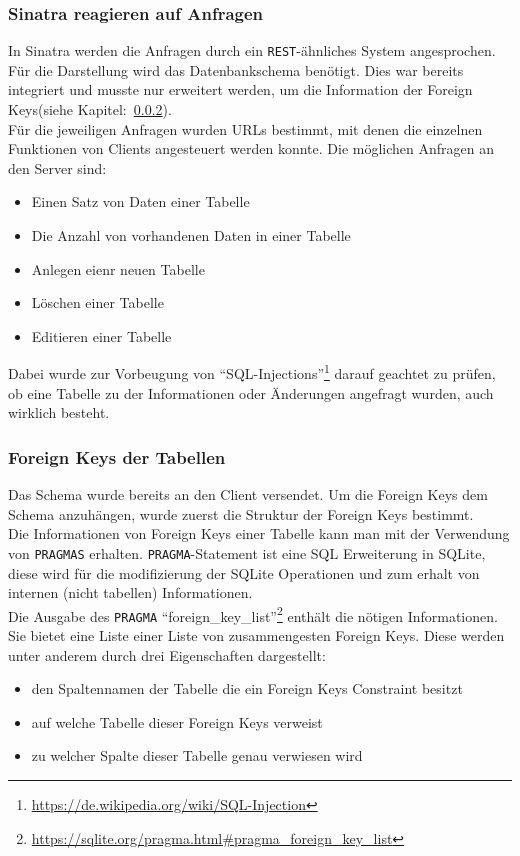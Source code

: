 \subsubsection{Sinatra reagieren auf Anfragen}
\label{subsubsec04:sinatra_client_reaction}
In Sinatra werden die Anfragen durch ein \texttt{REST}-ähnliches System angesprochen. Für die Darstellung wird das Datenbankschema benötigt. Dies war bereits integriert und musste nur erweitert werden, um die Information der Foreign Keys(siehe Kapitel:~\ref{subsubsec04:fk_table_server}). \\
Für die jeweiligen Anfragen wurden URLs bestimmt, mit denen die einzelnen Funktionen von Clients angesteuert werden konnte.
Die möglichen Anfragen an den Server sind:
\begin{itemize}
    \item Einen Satz von Daten einer Tabelle
    \item Die Anzahl von vorhandenen Daten in einer Tabelle
    \item Anlegen eienr neuen Tabelle
    \item Löschen einer Tabelle
    \item Editieren einer Tabelle
\end{itemize}

Dabei wurde zur Vorbeugung von ``SQL-Injections''\footnote{\url{https://de.wikipedia.org/wiki/SQL-Injection}} darauf geachtet zu prüfen, ob eine Tabelle zu der Informationen oder Änderungen angefragt wurden, auch wirklich besteht.

\subsubsection{Foreign Keys der Tabellen}
\label{subsubsec04:fk_table_server}
Das Schema wurde bereits an den Client versendet. Um die Foreign Keys dem Schema anzuhängen, wurde zuerst die Struktur der Foreign Keys bestimmt. \\
Die Informationen von Foreign Keys einer Tabelle kann man mit der Verwendung von \texttt{PRAGMAS} erhalten.
\texttt{PRAGMA}-Statement ist eine SQL Erweiterung in SQLite, diese wird für die modifizierung der SQLite Operationen und zum erhalt von internen (nicht tabellen) Informationen.\cite{sqlite_pragma} \\

Die Ausgabe des \texttt{PRAGMA} ``foreign\_key\_list''\footnote{\url{https://sqlite.org/pragma.html\#pragma_foreign_key_list}} enthält die nötigen Informationen. Sie bietet eine Liste einer Liste von zusammengesten Foreign Keys. Diese werden unter anderem durch drei Eigenschaften dargestellt:
\begin{itemize}
    \item den Spaltennamen der Tabelle die ein Foreign Keys Constraint besitzt
    \item auf welche Tabelle dieser Foreign Keys verweist
    \item zu welcher Spalte dieser Tabelle genau verwiesen wird
\end{itemize}

